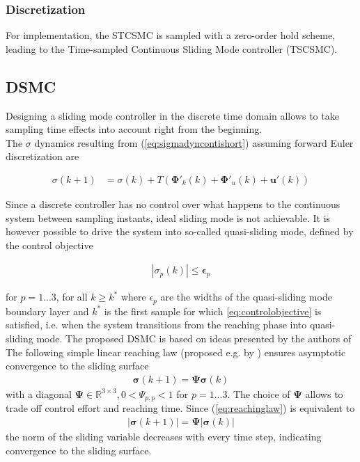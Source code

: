 \documentclass{ifacconf}
\providecommand{\mbf}[1]{\mathbf{#1}}
\newcommand{\idxSample}{{\ensuremath{k}}}
\newcommand{\idxAxis}{{\ensuremath{p}}}
\begin{document}
\subsubsection{\textbf{Discretization}}
For implementation, the STCSMC is sampled with a zero-order hold scheme, leading to the Time-sampled Continuous Sliding Mode controller (TSCSMC). 


\subsection{DSMC}
Designing a sliding mode controller in the discrete time domain allows to take sampling time effects into account right from the beginning. \\
The $\sigma$ dynamics resulting from (\ref{eq:sigmadyncontishort}) assuming forward Euler discretization are

\begin{align}
{{\sigma}}(\idxSample+1)
&=
{{\sigma}}(\idxSample)
+
T(
\mbf{\Phi}'_k(\idxSample) + \mbf{\Phi}'_u(\idxSample) + \mbf{u}'(\idxSample))
\label{eq:sigmadyndiscrete}
\end{align}

Since a discrete controller has no control over what happens to the continuous system between sampling instants, ideal sliding mode is not achievable. It is however possible to drive the system into so-called quasi-sliding mode, defined by the control objective

\begin{align}
|{\sigma}_\idxAxis (\idxSample)| \leq \mbf{\epsilon}_\idxAxis
\label{eq:controlobjective}
\end{align}

for $\idxAxis=1...3$, for all $\idxSample \geq \idxSample^*$ where $\epsilon_\idxAxis$ are the widths of the quasi-sliding mode boundary layer and $\idxSample^*$ is the first sample for which \ref{eq:controlobjective} is satisfied, i.e. when the system transitions from the reaching phase into quasi-sliding mode.
The proposed DSMC is based on ideas presented by the authors of \cite{monsees2001discrete}
The following simple linear reaching law (proposed e.g. by \cite{Spurgeon1992}) ensures asymptotic convergence to the sliding surface
\begin{align}
\mbf{\sigma}(\idxSample+1) = \mbf{\Psi} \mbf{\sigma}(\idxSample)
\label{eq:reachinglaw}
\end{align}
with a diagonal $\mbf{\Psi} \in \mathbb{R}^{3 \times 3}, 0 < \Psi_{\idxAxis,\idxAxis} < 1$ for $\idxAxis=1...3$. The choice of $\mbf{\Psi}$ allows to trade off control effort and reaching time.
Since (\ref{eq:reachinglaw}) is equivalent to
\begin{align}
|\mbf{\sigma}(\idxSample+1)| = \mbf{\Psi} |\mbf{\sigma}(\idxSample)|
\end{align}
the norm of the sliding variable decreases with every time step, indicating convergence to the sliding surface. 
\end{document}
